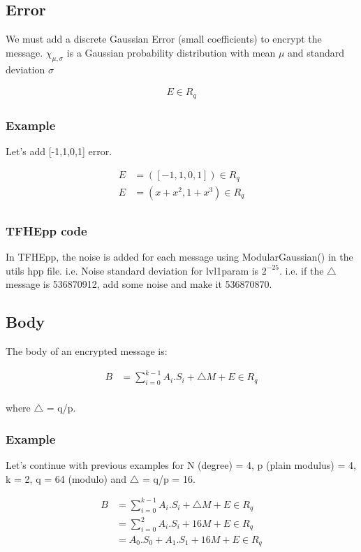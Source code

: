 \documentclass{techrep}
\theoremstyle{definition}
\theoremstyle{plain}
\begin{document}
	\subsection{Error}
We must add a discrete Gaussian Error (small coefficients) to encrypt the message.
$\chi_{\mu,\sigma}$ is a Gaussian probability distribution with mean $\mu$ and standard deviation $\sigma$

	\begin{align*}
		E \in R_q
	\end{align*}

\subsubsection{Example}

Let's add [-1,1,0,1] error.

\begin{align*} 
    E &= ([-1,1,0,1]) \in R_q \\ 
    E &= (x + x^2,1+x^3) \in R_q \\ 
\end{align*}

\subsubsection{TFHEpp code}
In TFHEpp, the noise is added for each message using ModularGaussian() in the utils hpp file.  
i.e. Noise standard deviation for lvl1param is $2^{-25}$. i.e. if the $\bigtriangleup$ message is 536870912, add some noise and make it 536870870. 

	\subsection{Body}
The body of an encrypted message is:

	\begin{align*}
		B &= \sum_{i=0}^{k-1}A_i . S_i + \bigtriangleup M + E \in R_q  \\
	\end{align*}

where $\bigtriangleup$ = q/p.

\subsubsection{Example}
Let’s continue with previous examples for N (degree) = 4, p (plain modulus) = 4, k = 2, q = 64 (modulo) and $\bigtriangleup$ = q/p = 16.

	\begin{align*}
		B &= \sum_{i=0}^{k-1}A_i . S_i + \bigtriangleup M + E \in R_q  \\
             &= \sum_{i=0}^2A_i . S_i + 16M + E \in R_q  \\
             &= A_0.S_0 + A_1.S_1 + 16M + E \in R_q  \\
	\end{align*}
\end{document}
